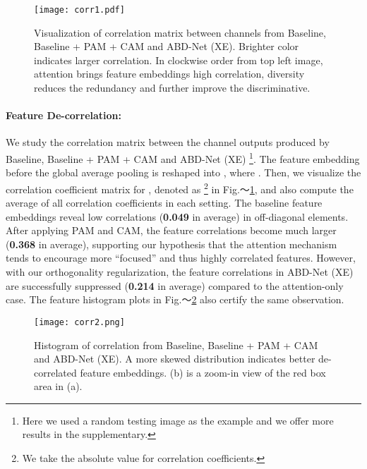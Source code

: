 \documentclass[10pt,twocolumn]{article}
\begin{document}
\begin{figure}[t]
\begin{center}
   \texttt{[image: corr1.pdf]}
\end{center}
\vspace{-1mm}
   \caption{Visualization of correlation matrix between channels from Baseline, Baseline + PAM + CAM and ABD-Net (XE). Brighter color indicates larger correlation. In clockwise order from top left image, attention brings feature embeddings high correlation, diversity reduces the redundancy and further improve the discriminative.}
\label{fig:visc}
\vspace{-1mm}
\end{figure}

\paragraph{Feature De-correlation:} We study the correlation matrix between the channel outputs produced by Baseline, Baseline + PAM + CAM and ABD-Net (XE) \footnote{Here we used a random testing image as the example and we offer more results in the supplementary.}. The feature embedding before the global average pooling is 
reshaped into , where . Then, we visualize the correlation coefficient matrix for , denoted as \footnote{We take the absolute value for correlation coefficients.} in Fig.～\ref{fig:visc}, and also compute the average of all correlation coefficients in each setting. The baseline feature embeddings reveal low correlations (\textbf{0.049} in average) in off-diagonal elements. After applying PAM and CAM, the feature correlations become much larger (\textbf{0.368} in average), supporting our hypothesis that the attention mechanism tends to encourage more ``focused'' and thus highly correlated features. However, with our orthogonality regularization, the feature correlations in ABD-Net (XE) are successfully suppressed (\textbf{0.214} in average) compared to the attention-only case. The feature histogram plots in Fig.～\ref{fig:visch} also certify the same observation.

\begin{figure}[t]
\begin{center}
   \texttt{[image: corr2.png]}
\end{center}
   \caption{Histogram of correlation from Baseline, Baseline + PAM + CAM and ABD-Net (XE). A more skewed distribution indicates better de-correlated feature embeddings. (b) is a zoom-in view of the red box area in (a).}
\label{fig:visch}
\vspace{-1mm}
\end{figure}
\end{document}
